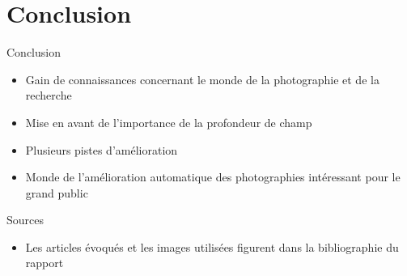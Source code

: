 \documentclass{beamer}
\begin{document}
\section{Conclusion}

\begin{frame}{Conclusion}
\begin{itemize}
\item Gain de connaissances concernant le monde de la photographie et de la recherche 
\item Mise en avant de l'importance de la profondeur de champ
\item Plusieurs pistes d'amélioration 
\item Monde de l'amélioration automatique des photographies intéressant pour le grand public
\end{itemize}
\end{frame}

\begin{frame}{Sources}
\begin{itemize}
\item Les articles évoqués et les images utilisées figurent dans la bibliographie du rapport 
\end{itemize}
\end{frame}
\end{document}

